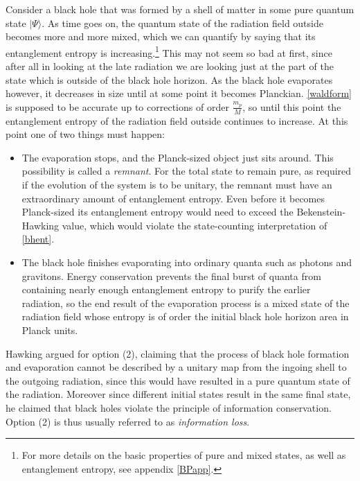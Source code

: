 \documentclass[12pt]{article}
\newcommand{\ran}{\rangle}
\begin{document}
Consider a black hole that was formed by a shell of matter in some pure quantum state $|\Psi\ran$.  As time goes on, the quantum state of the radiation field outside becomes more and more mixed, which we can quantify by saying that its entanglement entropy is increasing.\footnote{For more details on the basic properties of pure and mixed states, as well as entanglement entropy, see appendix \ref{BPapp}.}  This may not seem so bad at first, since after all in looking at the late radiation we are looking just at the part of the state which is outside of the black hole horizon.  As the black hole evaporates however, it decreases in size until at some point it becomes Planckian.  \eqref{waldform} is supposed to be accurate up to corrections of order $\frac{m_p}{M}$, so until this point the entanglement entropy of the radiation field outside continues to increase.  At this point one of two things must happen:
\begin{itemize}
\item[(1)] The evaporation stops, and the Planck-sized object just sits around.  This possibility is called a \textit{remnant}.  For the total state to remain pure, as required if the evolution of the system is to be unitary, the remnant must have an extraordinary amount of entanglement entropy. Even before it becomes Planck-sized its entanglement entropy would need to exceed the Bekenstein-Hawking value, which would violate the state-counting interpretation of \eqref{bhent}.
\item[(2)] The black hole finishes evaporating into ordinary quanta such as photons and gravitons.  Energy conservation prevents the final burst of quanta from containing nearly enough entanglement entropy to purify the earlier radiation, so the end result of the evaporation process is a mixed state of the radiation field whose entropy is of order the initial black hole horizon area in Planck units. 
\end{itemize}
Hawking argued for option (2), claiming that the process of black hole formation and evaporation cannot be described by a unitary map from the ingoing shell to the outgoing radiation, since this would have resulted in a pure quantum state of the radiation.  Moreover since different initial states result in the same final state, he claimed that black holes violate the principle of information conservation.  Option (2) is thus usually referred to as \textit{information loss}.   
\end{document}
